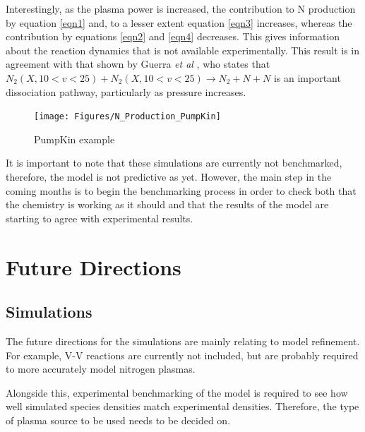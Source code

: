 \documentclass[11pt, oneside]{article}   	%
\begin{document}
Interestingly, as the plasma power is increased, the contribution to N production by equation \ref{eqn1} and, to a lesser extent equation \ref{eqn3} increases, whereas the contribution by equations \ref{eqn2} and \ref{eqn4} decreases.
This gives information about the reaction dynamics that is not available experimentally.
This result is in agreement with that shown by Guerra \textit{et al} \cite{Guerra2004kinetic}, who states that $N_2(X, 10<v<25) + N_2(X, 10<v<25) \rightarrow N_2 + N + N $ is an important dissociation pathway, particularly as pressure increases.

\begin{figure}
\texttt{[image: Figures/N\_Production\_PumpKin]}
\caption{PumpKin example}
\label{fig:pumpkin}
\end{figure}

It is important to note that these simulations are currently not benchmarked, therefore, the model is not predictive as yet.
However, the main step in the coming months is to begin the benchmarking process in order to check both that the chemistry is working as it should and that the results of the model are starting to agree with experimental results.

\section{Future Directions}
\subsection{Simulations}
The future directions for the simulations are mainly relating to model refinement.
For example, V-V reactions are currently not included, but are probably required to more accurately model nitrogen plasmas.

Alongside this, experimental benchmarking of the model is required to see how well simulated species densities match experimental densities.
Therefore, the type of plasma source to be used needs to be decided on.
\end{document}
